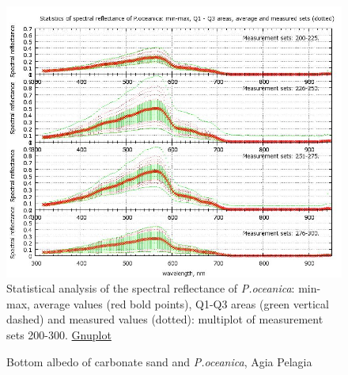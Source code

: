 \documentclass[11pt]{article}
\begin{document}
\begin{figure}[H]
	\centering
	\includegraphics[scale=0.40]{GNU-19.jpg}
	\caption{Statistical analysis of the spectral reflectance of \textit{P.oceanica}: min-max, average values (red bold points), Q1-Q3 areas (green vertical dashed) and 	measured values (dotted): multiplot of measurement sets 200-300. \href{http://www.gnuplot.info/}{Gnuplot}}
	\label{fig:4.10}
\end{figure}
\begin{figure}[H]
	\centering
	\caption{Bottom albedo of carbonate sand and \textit{P.oceanica}, Agia Pelagia}
	\label{fig:4.11}
\end{figure}
\end{document}
